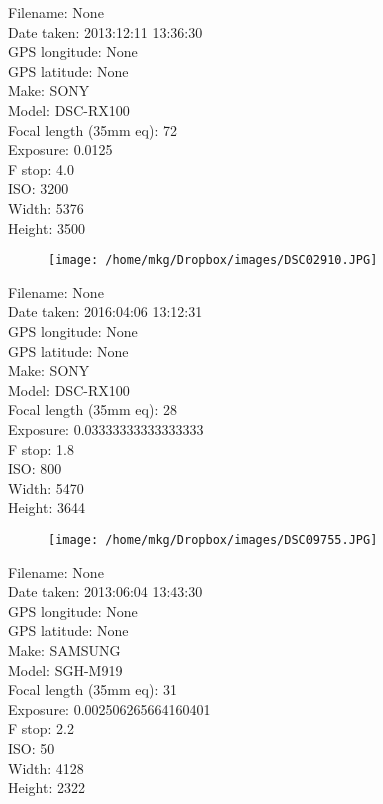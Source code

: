 \clearpage
\recalctypearea
\newpage
\noindent
Filename: None\\ 
Date taken: 2013:12:11 13:36:30\\ 
GPS longitude: None\\ 
GPS latitude: None\\ 
Make: SONY\\ 
Model: DSC-RX100\\ 
Focal length (35mm eq): 72\\ 
Exposure: 0.0125\\ 
F stop: 4.0\\ 
ISO: 3200\\ 
Width: 5376\\ 
Height: 3500\\ 

\clearpage
\recalctypearea
\newpage
\noindent
\begin{figure}
    \texttt{[image: /home/mkg/Dropbox/images/DSC02910.JPG]}
\end{figure}

\clearpage
\recalctypearea
\newpage
\noindent
Filename: None\\ 
Date taken: 2016:04:06 13:12:31\\ 
GPS longitude: None\\ 
GPS latitude: None\\ 
Make: SONY\\ 
Model: DSC-RX100\\ 
Focal length (35mm eq): 28\\ 
Exposure: 0.03333333333333333\\ 
F stop: 1.8\\ 
ISO: 800\\ 
Width: 5470\\ 
Height: 3644\\ 

\clearpage
\recalctypearea
\newpage
\noindent
\begin{figure}
    \texttt{[image: /home/mkg/Dropbox/images/DSC09755.JPG]}
\end{figure}

\clearpage
\recalctypearea
\newpage
\noindent
Filename: None\\ 
Date taken: 2013:06:04 13:43:30\\ 
GPS longitude: None\\ 
GPS latitude: None\\ 
Make: SAMSUNG\\ 
Model: SGH-M919\\ 
Focal length (35mm eq): 31\\ 
Exposure: 0.002506265664160401\\ 
F stop: 2.2\\ 
ISO: 50\\ 
Width: 4128\\ 
Height: 2322\\ 

